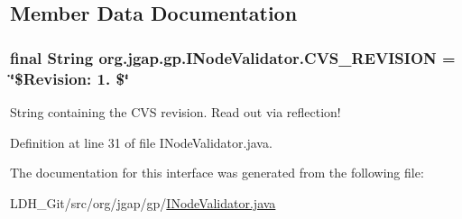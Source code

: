 \subsection{Member Data Documentation}
\hypertarget{interfaceorg_1_1jgap_1_1gp_1_1_i_node_validator_a15abecd09c27a7c9cee7ed7e6d0f095e}{
\subsubsection[{C\-V\-S\-\_\-\-R\-E\-V\-I\-S\-I\-O\-N}]{\setlength{\rightskip}{0pt plus 5cm}final String org.\-jgap.\-gp.\-I\-Node\-Validator.\-C\-V\-S\-\_\-\-R\-E\-V\-I\-S\-I\-O\-N = \char`\"{}\$Revision\-: 1. \$\char`\"{}\hspace{0.3cm}{\ttfamily [static]}}}\label{interfaceorg_1_1jgap_1_1gp_1_1_i_node_validator_a15abecd09c27a7c9cee7ed7e6d0f095e}
String containing the C\-V\-S revision. Read out via reflection! 

Definition at line 31 of file I\-Node\-Validator.\-java.



The documentation for this interface was generated from the following file\-:\begin{DoxyCompactItemize}
\item 
L\-D\-H\-\_\-\-Git/src/org/jgap/gp/\hyperlink{_i_node_validator_8java}{I\-Node\-Validator.\-java}\end{DoxyCompactItemize}
